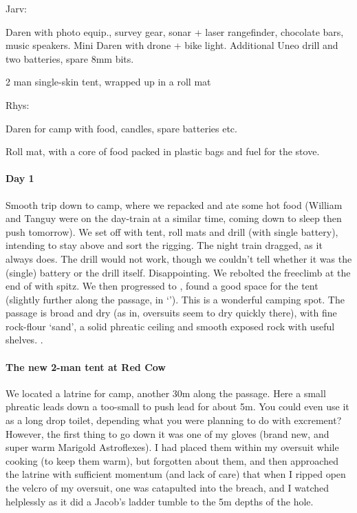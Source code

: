 Jarv:
\begin{citemize}
\item Daren with photo equip., survey gear, sonar + laser rangefinder, chocolate bars, music speakers. Mini Daren with drone + bike light. Additional Uneo drill and two batteries, spare 8mm bits.
\item 2 man single-skin tent, wrapped up in a roll mat
\end{citemize}

Rhys:
\begin{citemize}
\item Daren for camp with food, candles, spare batteries etc.
\item Roll mat, with a core of food packed in plastic bags and fuel for the stove.
\end{citemize}


\paragraph{Day 1}
Smooth trip down to camp, where we repacked and ate some hot food (William and Tanguy were on the day-train at a similar time, coming down to sleep then push tomorrow).
We set off with tent, roll mats and drill (with single battery), intending to stay above  and sort the rigging.
The night train dragged, as it always does. The drill would not work, though we couldn't tell whether it was the (single) battery or the drill itself. Disappointing. We rebolted the freeclimb at the end of  with spitz.
We then progressed to , found a good space for the tent (slightly further along the passage, in `'). This is a wonderful camping spot. The passage is broad and dry (as in, oversuits seem to dry quickly there), with fine rock-flour `sand', a solid phreatic ceiling and smooth exposed rock with useful shelves. .

\paragraph{The new 2-man tent at Red Cow} We located a latrine for camp, another 30m along the passage. Here a small phreatic leads down a too-small to push lead for about 5m. You could even use it as a long drop toilet, depending what you were planning to do with excrement? However, the first thing to go down it was one of my gloves (brand new, and super warm Marigold Astroflexes). I had placed them within my oversuit while cooking (to keep them warm), but forgotten about them, and then approached the latrine with sufficient momentum (and lack of care) that when I ripped open the velcro of my oversuit, one was catapulted into the breach, and I watched helplessly as it did a Jacob's ladder tumble to the 5m depths of the hole.

